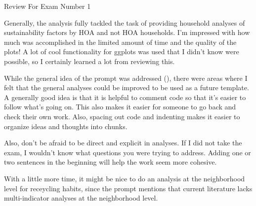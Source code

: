 \documentclass{article}
\begin{document}

\begin{center}
  {\LARGE Review For Exam Number 1}\\\vspace{1em}
\end{center}

Generally, the analysis fully tackled the task of providing household analyses of sustainability factors by HOA and not HOA households. I'm impressed with how much was accomplished in the limited amount of time and the quality of the plots! A lot of cool functionality for ggplots was used that I didn't know were possible, so I certainly learned a lot from reviewing this. 
\newline

While the general idea of the prompt was addressed (), there were areas where I felt that the general analyses could be improved to be used as a future template. A generally good idea is that it is helpful to comment code so that it's easier to follow what's going on. This also makes it easier for someone to go back and check their own work. Also, spacing out code and indenting makes it easier to organize ideas and thoughts into chunks.
\newline

Also, don't be afraid to be direct and explicit in analyses. If I did not take the exam, I wouldn't know what questions you were trying to address. Adding one or two sentences in the beginning will help the work seem more cohesive.
\newline

With a little more time, it might be nice to do an analysis at the neighborhood level for receycling habits, since the prompt mentions that current literature lacks multi-indicator analyses at the neighborhood level.  \\
\end{document}
